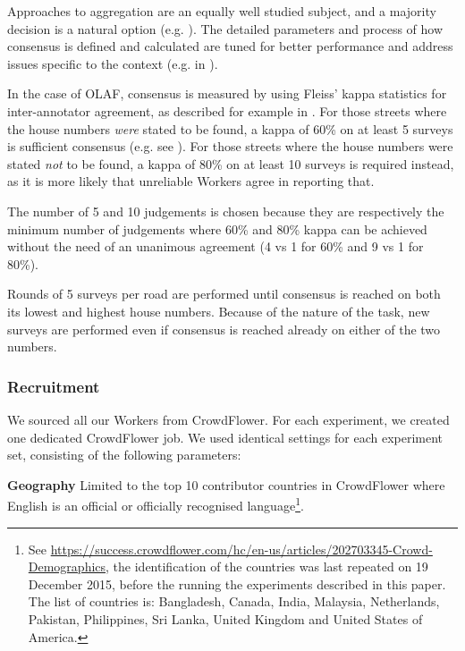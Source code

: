         Approaches to aggregation are an equally well studied subject, and a majority decision is a natural option (e.g. \cite{Le:2010ug}). The detailed parameters and process of how consensus is defined and calculated are tuned for better performance and address issues specific to the context (e.g. in \cite{Hirth:2011fh}). 
        
        In the case of OLAF, consensus is measured by using Fleiss' kappa statistics for inter-annotator agreement, as described for example in \cite{Nowak:2010gt}. For those streets where the house numbers {\it were} stated to be found, a kappa of 60\% on at least 5 surveys is sufficient consensus (e.g. see \cite{Landis:1977kv}). For those streets where the house numbers were stated {\it not} to be found, a kappa of 80\% on at least 10 surveys is required instead, as it is more likely that unreliable Workers agree in reporting that.
        
        The number of 5 and 10 judgements is chosen because they are respectively the minimum number of judgements where 60\% and 80\% kappa can be achieved without the need of an unanimous agreement (4 vs 1 for 60\% and 9 vs 1 for 80\%). 
        
        Rounds of 5 surveys per road are performed until consensus is reached on both its lowest and highest house numbers. Because of the nature of the task, new surveys are performed even if consensus is reached already on either of the two numbers.  
    
    \subsubsection{Recruitment}
        
        We sourced all our Workers from CrowdFlower. For each experiment, we created one dedicated CrowdFlower job. We used identical settings for each experiment set, consisting of the following parameters:
        
        \textbf{Geography} Limited to the top 10 contributor countries in CrowdFlower where English is an official or officially recognised language\footnote{See \url{https://success.crowdflower.com/hc/en-us/articles/202703345-Crowd-Demographics}, the identification of the countries was last repeated on 19 December 2015, before the running the experiments described in this paper. The list of countries is: Bangladesh, Canada, India, Malaysia, Netherlands, Pakistan, Philippines, Sri Lanka, United Kingdom and United States of America.}.
        
